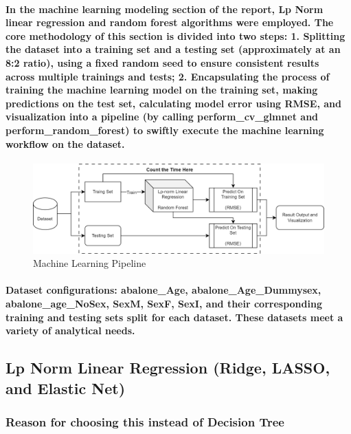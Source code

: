 \documentclass[11pt]{article} %
\begin{document}
\paragraph{In the machine learning modeling section of the report, Lp Norm linear regression and random forest algorithms were employed. The core methodology of this section is divided into two steps: 1. Splitting the dataset into a training set and a testing set (approximately at an 8:2 ratio), using a fixed random seed to ensure consistent results across multiple trainings and tests; 2. Encapsulating the process of training the machine learning model on the training set, making predictions on the test set, calculating model error using RMSE, and visualization into a pipeline (by calling perform\_cv\_glmnet and perform\_random\_forest) to swiftly execute the machine learning workflow on the dataset.
}
\begin{figure}[H]
    \centering
    \includegraphics[width=\textwidth]{Pic/Pipeline.png}
    \caption{Machine Learning Pipeline}
\end{figure}
\paragraph{Dataset configurations: abalone\_Age, abalone\_Age\_Dummysex, abalone\_age\_NoSex, SexM, SexF, SexI, and their corresponding training and testing sets split for each dataset. These datasets meet a variety of analytical needs.}
% 
\subsection{Lp Norm Linear Regression (Ridge, LASSO, and Elastic Net)}
\subsubsection{Reason for choosing this instead of Decision Tree}
\end{document}
